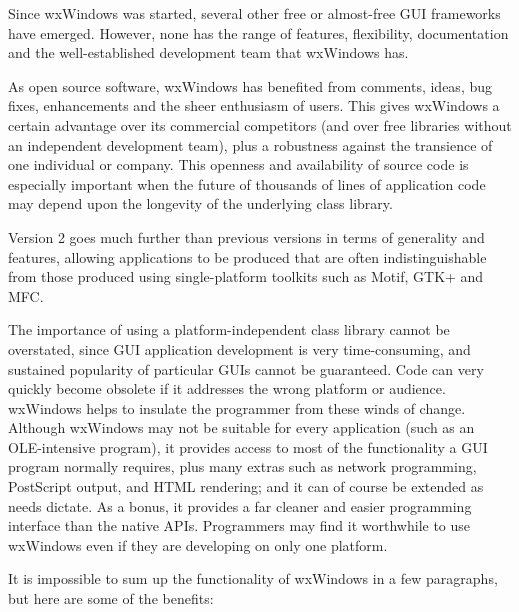 Since wxWindows was started, several other free or almost-free GUI frameworks have
emerged. However, none has the range of features, flexibility, documentation and the
well-established development team that wxWindows has.

As open source software, wxWindows has
benefited from comments, ideas, bug fixes, enhancements and the sheer
enthusiasm of users. This gives wxWindows a
certain advantage over its commercial competitors (and over free libraries
without an independent development team), plus a robustness against
the transience of one individual or company. This openness and
availability of source code is especially important when the future of
thousands of lines of application code may depend upon the longevity of
the underlying class library.

Version 2 goes much further than previous versions in terms of generality and features,
allowing applications to be produced
that are often indistinguishable from those produced using single-platform
toolkits such as Motif, GTK+ and MFC.

The importance of using a platform-independent class library cannot be
overstated, since GUI application development is very time-consuming,
and sustained popularity of particular GUIs cannot be guaranteed.
Code can very quickly become obsolete if it addresses the wrong
platform or audience.  wxWindows helps to insulate the programmer from
these winds of change. Although wxWindows may not be suitable for
every application (such as an OLE-intensive program), it provides access to most of the functionality a
GUI program normally requires, plus many extras such as network programming,
PostScript output, and HTML rendering; and it can of course be extended as needs dictate.  As a bonus, it provides
a far cleaner and easier programming interface than the native
APIs. Programmers may find it worthwhile to use wxWindows even if they
are developing on only one platform.

It is impossible to sum up the functionality of wxWindows in a few paragraphs, but
here are some of the benefits:

